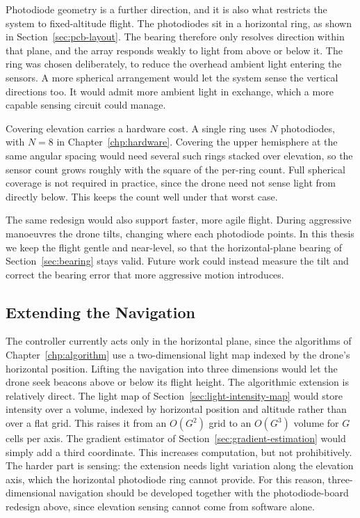 Photodiode geometry is a further direction, and it is also what restricts the system to fixed-altitude flight. The photodiodes sit in a horizontal ring, as shown in Section~\ref{sec:pcb-layout}. The bearing therefore only resolves direction within that plane, and the array responds weakly to light from above or below it. The ring was chosen deliberately, to reduce the overhead ambient light entering the sensors. A more spherical arrangement would let the system sense the vertical directions too. It would admit more ambient light in exchange, which a more capable sensing circuit could manage.

Covering elevation carries a hardware cost. A single ring uses $N$ photodiodes, with $N=8$ in Chapter~\ref{chp:hardware}. Covering the upper hemisphere at the same angular spacing would need several such rings stacked over elevation, so the sensor count grows roughly with the square of the per-ring count. Full spherical coverage is not required in practice, since the drone need not sense light from directly below. This keeps the count well under that worst case.

The same redesign would also support faster, more agile flight. During aggressive manoeuvres the drone tilts, changing where each photodiode points. In this thesis we keep the flight gentle and near-level, so that the horizontal-plane bearing of Section~\ref{sec:bearing} stays valid. Future work could instead measure the tilt and correct the bearing error that more aggressive motion introduces.

\subsection{Extending the Navigation}
\label{sec:fw-navigation}

The controller currently acts only in the horizontal plane, since the algorithms of Chapter~\ref{chp:algorithm} use a two-dimensional light map indexed by the drone's horizontal position. Lifting the navigation into three dimensions would let the drone seek beacons above or below its flight height. The algorithmic extension is relatively direct. The light map of Section~\ref{sec:light-intensity-map} would store intensity over a volume, indexed by horizontal position and altitude rather than over a flat grid. This raises it from an $O(G^2)$ grid to an $O(G^3)$ volume for $G$ cells per axis. The gradient estimator of Section~\ref{sec:gradient-estimation} would simply add a third coordinate. This increases computation, but not prohibitively. The harder part is sensing: the extension needs light variation along the elevation axis, which the horizontal photodiode ring cannot provide. For this reason, three-dimensional navigation should be developed together with the photodiode-board redesign above, since elevation sensing cannot come from software alone.

